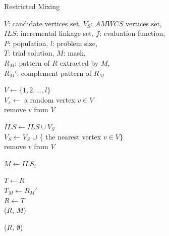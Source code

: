 \documentclass{sig-alternate-05-2015}
\begin{document}
\begin{algorithm}
\caption{Restricted Mixing}\label{algo_disjdecomp}

$V$: candidate vertices set, $V_S$: $AMWCS$ vertices set,  \\
$ILS$: incremental linkage set, $f$: evaluation function, \\
$P$: population, $l$: problem size, \\
$T$: trial solution, $M$: mask, \\
${R_M}$: pattern of $R$ extracted by $M$, \\
${R_M}'$: complement pattern of ${R_M}$


\BlankLine
$V \leftarrow \{ 1, 2, ..., l \}$ \\
$V_s \leftarrow$ a random vertex $v \in V$ \\
remove $v$ from $V$ \\

 {

    $ILS \leftarrow ILS \cup V_{S}$ \\
    $V_S \leftarrow V_S$ $\cup$ \{ the nearest vertex $v \in V \}$ \\
    
    remove $v$ from $V$ \\
}

\BlankLine
{} {

    $M \leftarrow ILS_i$ \\

     {

        $T \leftarrow R$ \\
        $T_M \leftarrow {R_M}'$ \\

         {
            $R \leftarrow T$ \\
            \Return ($R$, $M$)
        }
    }
}
\Return ($R$, $\emptyset$) 
\end{algorithm}
\end{document}
